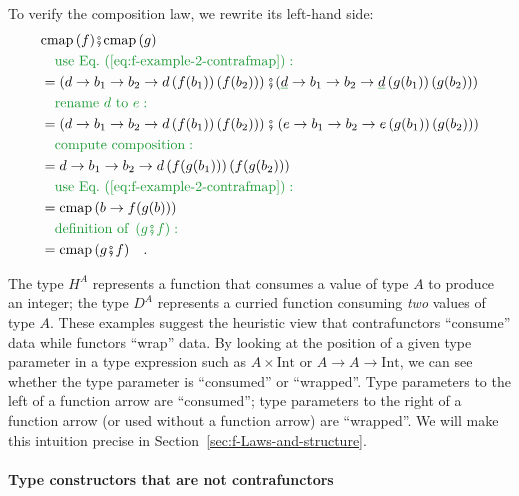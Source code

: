 To verify the composition law, we rewrite its left-hand side:
\begin{align*}
 & \text{cmap}\,(f)\bef\text{cmap}\,(g)\\
 & \quad{\color{greenunder}\text{use Eq.~(\ref{eq:f-example-2-contrafmap})}:}\quad\\
 & =\left(d\rightarrow b_{1}\rightarrow b_{2}\rightarrow d\left(f(b_{1})\right)\left(f(b_{2})\right)\right)\bef(\gunderline d\rightarrow b_{1}\rightarrow b_{2}\rightarrow\gunderline d\left(g(b_{1})\right)\left(g(b_{2})\right))\\
 & \quad{\color{greenunder}\text{rename }d\text{ to }e:}\quad\\
 & =\left(d\rightarrow b_{1}\rightarrow b_{2}\rightarrow d\left(f(b_{1})\right)\left(f(b_{2})\right)\right)\bef\left(e\rightarrow b_{1}\rightarrow b_{2}\rightarrow e\left(g(b_{1})\right)\left(g(b_{2})\right)\right)\\
 & \quad{\color{greenunder}\text{compute composition}:}\quad\\
 & =d\rightarrow b_{1}\rightarrow b_{2}\rightarrow d\left(f(g(b_{1}))\right)\left(f(g(b_{2}))\right)\\
 & \quad{\color{greenunder}\text{use Eq.~(\ref{eq:f-example-2-contrafmap})}:}\quad\\
 & =\text{cmap}\,(b\rightarrow f(g(b)))\\
 & \quad{\color{greenunder}\text{definition of }\left(g\bef f\right):}\quad\\
 & =\text{cmap}\,(g\bef f)\quad.
\end{align*}

The type $H^{A}$ represents a function that consumes a value of type
$A$ to produce an integer; the type $D^{A}$ represents a curried
function consuming \emph{two} values of type $A$. These examples
suggest the heuristic view that contrafunctors \textsf{``}consume\textsf{''} data
while functors \textsf{``}wrap\textsf{''} data. By looking at the position of a given
type parameter in a type expression such as $A\times\text{Int}$ or
$A\rightarrow A\rightarrow\text{Int}$, we can see whether the type
parameter is \textsf{``}consumed\textsf{''} or \textsf{``}wrapped\textsf{''}. Type parameters to the
left of a function arrow are \textsf{``}consumed\textsf{''}; type parameters to the
right of a function arrow (or used without a function arrow) are \textsf{``}wrapped\textsf{''}.
We will make this intuition precise in Section~\ref{sec:f-Laws-and-structure}.

\paragraph{Type constructors that are not contrafunctors }


